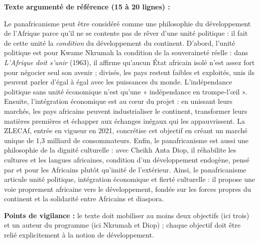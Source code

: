 \documentclass[11pt]{article}
\begin{document}
\begin{corrige}
\textbf{Texte argumenté de référence (15 à 20 lignes) :}

Le panafricanisme peut être considéré comme une philosophie du développement de l'Afrique parce qu'il ne se contente pas de rêver d'une unité politique : il fait de cette unité la \emph{condition} du développement du continent. D'abord, l'unité politique est pour Kwame Nkrumah la condition de la souveraineté réelle : dans \emph{L'Afrique doit s'unir} (1963), il affirme qu'aucun État africain isolé n'est assez fort pour négocier seul son avenir ; divisés, les pays restent faibles et exploités, unis ils peuvent parler d'égal à égal avec les puissances du monde. L'indépendance politique sans unité économique n'est qu'une « indépendance en trompe-l'œil ». Ensuite, l'intégration économique est au cœur du projet : en unissant leurs marchés, les pays africains peuvent industrialiser le continent, transformer leurs matières premières et échapper aux échanges inégaux qui les appauvrissent. La ZLECAf, entrée en vigueur en 2021, concrétise cet objectif en créant un marché unique de 1,3 milliard de consommateurs. Enfin, le panafricanisme est aussi une philosophie de la dignité culturelle : avec Cheikh Anta Diop, il réhabilite les cultures et les langues africaines, condition d'un développement endogène, pensé par et pour les Africains plutôt qu'imité de l'extérieur. Ainsi, le panafricanisme articule unité politique, intégration économique et fierté culturelle : il propose une voie proprement africaine vers le développement, fondée sur les forces propres du continent et la solidarité entre Africains et diaspora.

\textbf{Points de vigilance :} le texte doit mobiliser au moins deux objectifs (ici trois) et un auteur du programme (ici Nkrumah et Diop) ; chaque objectif doit être relié explicitement à la notion de développement.
\end{corrige}
\end{document}
